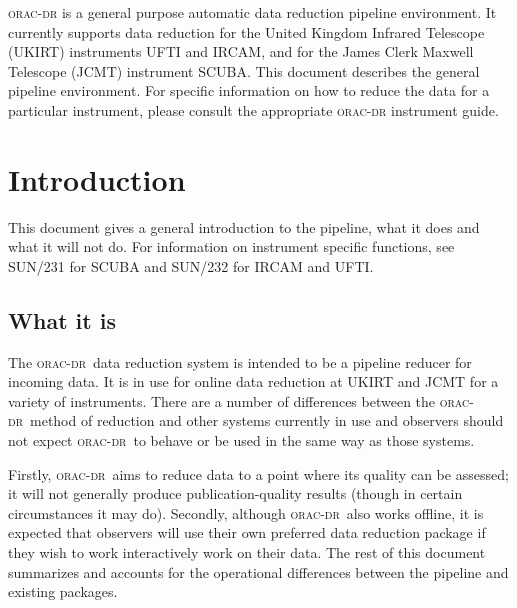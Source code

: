 \documentclass[twoside,11pt]{article}
\newcommand{\stardocinitials}  {SUN}
\newcommand{\stardocnumber}    {230.1}
\newcommand{\stardocabstract}  {\textsc{orac-dr} is a general purpose
automatic data reduction pipeline environment. It currently supports data
reduction for the United Kingdom Infrared Telescope (UKIRT) instruments UFTI
and IRCAM, and for the James Clerk Maxwell Telescope (JCMT) instrument
SCUBA. This document describes the general pipeline environment. For specific
information on how to reduce the data for a particular instrument, please
consult the appropriate \textsc{orac-dr} instrument guide.}
\newcommand{\stardocname}{\stardocinitials /\stardocnumber}
\newenvironment{latexonly}{}{}
\newcommand{\xref}[3]{#1}
\newcommand{\xlabel}[1]{}
\renewcommand{\_}{\texttt{\symbol{95}}}
\def\C++{{\rm C\kern-.05em\raise.3ex\hbox{\footnotesize ++}}}
\newcommand{\underscore}{\_}
\newcommand{\oracdr}{\textsc{orac-dr}}
\renewcommand{\thepage}{\roman{page}}
\begin{document}
\stardocabstract
  \newpage
  \begin{latexonly}
    \setlength{\parskip}{0mm}
    \tableofcontents
    \setlength{\parskip}{\medskipamount}
    \markboth{\stardocname}{\stardocname}
  \end{latexonly}
\cleardoublepage
\renewcommand{\thepage}{\arabic{page}}
\setcounter{page}{1}



\section{Introduction\xlabel{introduction}}

This document gives a general introduction to the pipeline, what it
does and what it will not do. For information on instrument
specific functions, see \xref{SUN/231}{sun231}{} for SCUBA and
\xref{SUN/232}{sun232}{} for IRCAM and UFTI.

\subsection*{What it is}

The \oracdr\ data reduction system is intended to be a pipeline reducer
for incoming data. It is in use for online data reduction at UKIRT and
JCMT for a variety of instruments. There are a number of differences
between the \oracdr\ method of reduction and other systems currently in
use and observers should not expect \oracdr\ to behave or be used in
the same way as those systems.

Firstly, \oracdr\ aims to reduce data to a point where its quality can
be assessed; it will not generally produce publication-quality results
(though in certain circumstances it may do).  Secondly, although
\oracdr\ also works offline, it is expected that observers will use
their own preferred data reduction package if they wish to work
interactively work on their data. The rest of this document summarizes
and accounts for the operational differences between the pipeline and
existing packages.
\end{document}
